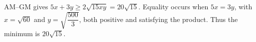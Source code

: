 AM--GM gives $ 5x+3y\ge2\sqrt{15xy}=20\sqrt{15}$. Equality occurs when $ 5x=3y $, with $ x=\sqrt{60}$ and $ y=\sqrt{\dfrac{500}{3}}$, both positive and satisfying the product. Thus the minimum is $\boxed{20\sqrt{15}}$.
